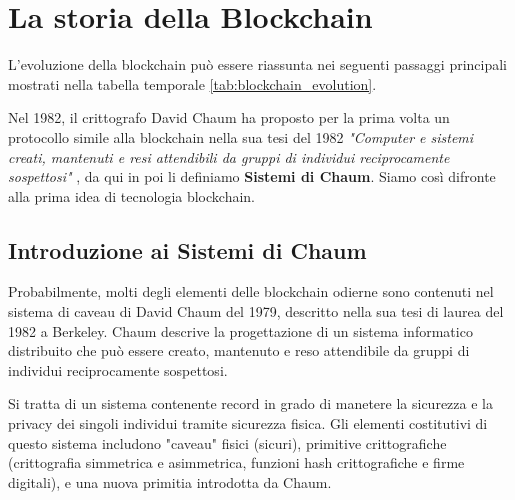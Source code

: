 \section{La storia della Blockchain}

L'evoluzione della blockchain può essere riassunta nei seguenti passaggi principali mostrati nella tabella temporale \ref{tab:blockchain_evolution}.

Nel 1982, il crittografo David Chaum ha proposto per la prima volta un protocollo simile alla blockchain nella sua tesi del 1982 \textit{"Computer e sistemi creati, mantenuti e resi attendibili da gruppi di individui reciprocamente sospettosi"} \cite{computer_systems_chaum}, da qui in poi li definiamo \textbf{Sistemi di Chaum}. Siamo così difronte alla prima idea di tecnologia blockchain.

\begin{table}[htbp]
  \centering
  \caption{Evoluzione della Blockchain}
  \label{tab:blockchain_evolution}
\end{table}

\subsection{Introduzione ai Sistemi di Chaum}
Probabilmente, molti degli elementi delle blockchain odierne sono contenuti nel sistema di caveau di David Chaum del 1979, descritto nella sua tesi di laurea del 1982 a Berkeley. Chaum descrive la progettazione di un sistema informatico distribuito che può essere creato, mantenuto e reso attendibile da gruppi di individui reciprocamente sospettosi.

Si tratta di un sistema contenente record in grado di manetere la sicurezza e la privacy dei singoli individui tramite sicurezza fisica. Gli elementi costitutivi di questo sistema includono "caveau" fisici (sicuri), primitive crittografiche (crittografia simmetrica e asimmetrica, funzioni hash crittografiche e firme digitali), e una nuova primitia introdotta da Chaum.

